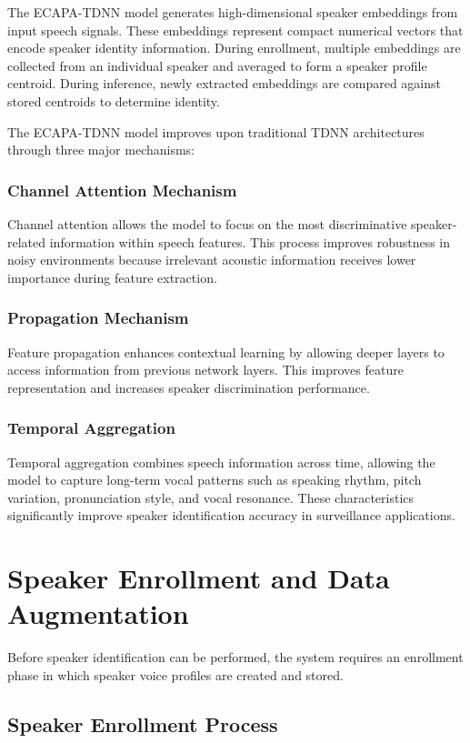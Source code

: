 \documentclass[12pt]{report}
\begin{document}
The ECAPA-TDNN model generates high-dimensional speaker embeddings from input speech signals. These embeddings represent compact numerical vectors that encode speaker identity information. During enrollment, multiple embeddings are collected from an individual speaker and averaged to form a speaker profile centroid. During inference, newly extracted embeddings are compared against stored centroids to determine identity.

The ECAPA-TDNN model improves upon traditional TDNN architectures through three major mechanisms:

\subsubsection{Channel Attention Mechanism}
Channel attention allows the model to focus on the most discriminative speaker-related information within speech features. This process improves robustness in noisy environments because irrelevant acoustic information receives lower importance during feature extraction.

\subsubsection{Propagation Mechanism}
Feature propagation enhances contextual learning by allowing deeper layers to access information from previous network layers. This improves feature representation and increases speaker discrimination performance.

\subsubsection{Temporal Aggregation}
Temporal aggregation combines speech information across time, allowing the model to capture long-term vocal patterns such as speaking rhythm, pitch variation, pronunciation style, and vocal resonance. These characteristics significantly improve speaker identification accuracy in surveillance applications.

\section{Speaker Enrollment and Data Augmentation}

Before speaker identification can be performed, the system requires an enrollment phase in which speaker voice profiles are created and stored.

\subsection{Speaker Enrollment Process}
\end{document}
